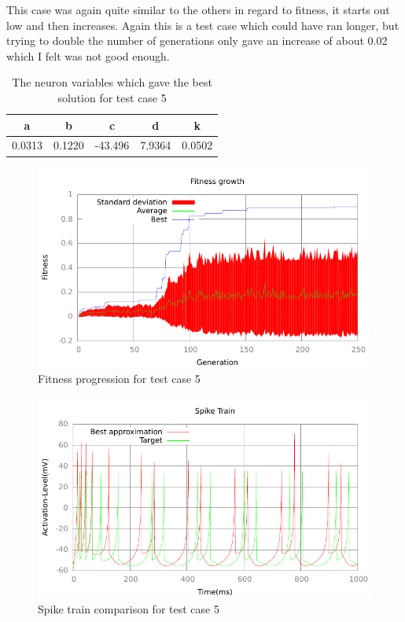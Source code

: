 This case was again quite similar to the others in regard to fitness, it starts
out low and then increases. Again this is a test case which could have ran
longer, but trying to double the number of generations only gave an increase of
about 0.02 which I felt was not good enough.
\begin{table}
	\begin{tabular}{c c c c c}
		a & b & c & d & k \\
		\hline
		0.0313 & 0.1220 & -43.496 & 7.9364 & 0.0502
	\end{tabular}
	\caption{The neuron variables which gave the best solution for test case
	5}
\end{table}
\begin{figure}[h]
	\centering
	\includegraphics{../output/sidm_izzy_2_fitness.pdf}
	\caption{Fitness progression for test case 5}
	\label{fig:fitness-test-case-5}
\end{figure}
\begin{figure}[h]
	\centering
	\includegraphics{../output/sidm_izzy_2_spike.pdf}
	\caption{Spike train comparison for test case 5}
	\label{fig:spike-test-case-5}
\end{figure}

